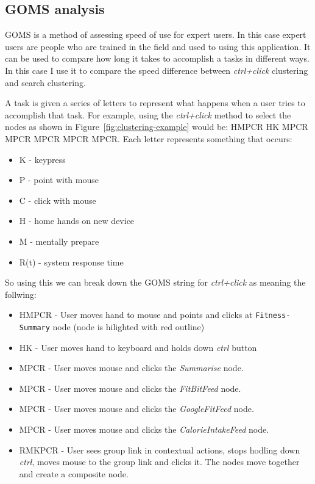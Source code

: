 \subsection{GOMS analysis}
\label{sub:goms_analysis}

GOMS is a method of assessing speed of use for expert users. In this case expert users are people who are trained in the field and used to using this application. It can be used to compare how long it takes to accomplish a tasks in different ways. In this case I use it to compare the speed difference between \textit{ctrl+click} clustering and search clustering.

A task is given a series of letters to represent what happens when a user tries to accomplish that task. For example, using the \textit{ctrl+click} method to select the nodes as shown in Figure~\ref{fig:clustering-example} would be: HMPCR HK MPCR MPCR MPCR MPCR MPCR. Each letter represents something that occurs:

\begin{itemize}
\item K - keypress
\item P - point with mouse
\item C - click with mouse
\item H - home hands on new device
\item M - mentally prepare
\item R(t) - system response time
\end{itemize}

So using this we can break down the GOMS string for \textit{ctrl+click} as meaning the follwing:

\begin{itemize}
	\item HMPCR - User moves hand to mouse and points and clicks at \texttt{Fitness-Summary} node (node is hilighted with red outline)
\item HK - User moves hand to keyboard and holds down \textit{ctrl} button
\item MPCR - User moves mouse and clicks the \textit{Summarise} node.
\item MPCR - User moves mouse and clicks the \textit{FitBitFeed} node.
\item MPCR - User moves mouse and clicks the \textit{GoogleFitFeed} node.
\item MPCR - User moves mouse and clicks the \textit{CalorieIntakeFeed} node.
\item RMKPCR - User sees group link in contextual actions, stops hodling down \textit{ctrl}, moves mouse to the group link and clicks it. The nodes move together and create a composite node.
\end{itemize}


